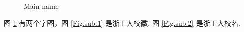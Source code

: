 \documentclass[a4paper,12pt]{ctexart}
\begin{document}
\begin{figure}[H]
  \centering  %
  \caption{Main name}
  \label{Fig.main}
\end{figure}

图 \ref{Fig.main} 有两个字图，图 \ref{Fig.sub.1} 是浙工大校徽, 图 \ref{Fig.sub.2} 是浙工大校名.
\end{document}
